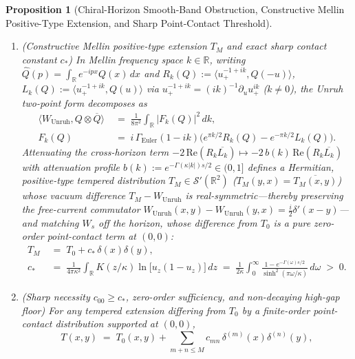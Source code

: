 \documentclass[11pt,a4paper]{article}
\newtheorem{proposition}{Proposition}
\theoremstyle{definition}
\theoremstyle{remark}
\newcommand{\bbR}{\mathbb{R}}
\newcommand{\1}{\mathbf{1}}
\begin{document}
\begin{proposition}[Chiral-Horizon Smooth-Band Obstruction, Constructive Mellin Positive-Type Extension, and Sharp Point-Contact Threshold]
\begin{enumerate}
  \item[(c)] \emph{(Constructive Mellin positive-type extension $T_M$ and exact sharp contact constant $c_*$)} In Mellin frequency space $k\in\bbR$, writing $\widehat{Q}(p)=\int_{\bbR}e^{-ipx}Q(x)\,dx$ and $R_k(Q):=\langle u_+^{-1+ik}, Q(-u)\rangle$, $L_k(Q):=\langle u_+^{-1+ik}, Q(u)\rangle$ via $u_+^{-1+ik}=(ik)^{-1}\partial_u u_+^{ik}$ ($k\neq 0$), the Unruh two-point form decomposes as
  \begin{equation}\label{eq:mellin-unruh}
    \begin{aligned}
      \langle W_{\mathrm{Unruh}}, Q\otimes\overline{Q}\rangle
      &\;=\; \frac{1}{8\pi^2}\int_{\bbR}|F_k(Q)|^2\,dk, \\
      F_k(Q)
      &\;=\; i\,\Gamma_{\mathrm{Euler}}(1-ik)\bigl(e^{\pi k/2}R_k(Q)-e^{-\pi k/2}L_k(Q)\bigr).
    \end{aligned}
  \end{equation}
  Attenuating the cross-horizon term $-2\,\mathrm{Re}(R_k\overline{L_k}) \mapsto -2\,b(k)\,\mathrm{Re}(R_k\overline{L_k})$ with attenuation profile $b(k):=e^{-\Gamma(\kappa|k|)s/2}\in(0,1]$ defines a \emph{Hermitian}, positive-type tempered distribution $T_M\in\mathcal{S}'(\bbR^2)$ ($T_M(y,x)=\overline{T_M(x,y)}$) whose vacuum difference $T_M-W_{\mathrm{Unruh}}$ is real-symmetric---thereby preserving the free-current commutator $W_{\mathrm{Unruh}}(x,y)-W_{\mathrm{Unruh}}(y,x)=\frac{i}{2}\delta'(x-y)$---and matching $W_s$ off the horizon, whose difference from $T_0$ is a pure zero-order point-contact term at $(0,0)$:
  \begin{equation}\label{eq:mellin-cstar}
    \begin{aligned}
      T_M &\;=\; T_0 + c_*\,\delta(x)\delta(y), \\
      c_* &\;=\; \frac{1}{4\pi\kappa^2}\int_{\bbR}K(z/\kappa)\ln\bigl[u_z(1-u_z)\bigr]\,dz
           \;=\; \frac{1}{2\kappa}\int_0^\infty \frac{1 - e^{-\Gamma(\omega)s/2}}{\sinh^2(\pi\omega/\kappa)}\,d\omega \;>\; 0.
    \end{aligned}
  \end{equation}
  \item[(d)] \emph{(Sharp necessity $c_{00}\ge c_*$, zero-order sufficiency, and non-decaying high-gap floor)} For \emph{any} tempered extension differing from $T_0$ by a finite-order point-contact distribution supported at $(0,0)$,
  \begin{equation}\label{eq:point-contact-ext}
    T(x,y) \;=\; T_0(x,y) + \sum_{m+n \le M} c_{mn}\,\delta^{(m)}(x)\delta^{(n)}(y),
  \end{equation}

\end{enumerate}
\end{proposition}
\end{document}
